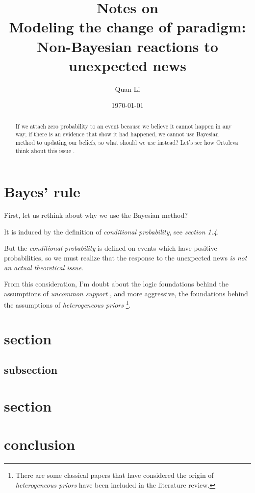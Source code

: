 \documentclass[12pt,letterpaper]{article}
\begin{document}
\title{\textbf{Notes on \citep{ortoleva2012modeling}}\\{\small \textbf{Modeling the change of paradigm: Non-Bayesian reactions to unexpected news}}}
\author{Quan Li}
\date{\today}
\maketitle

\begin{abstract}
If we attach zero probability to an event because we believe it cannot happen in any way, if there is an evidence that show it had happened, we cannot use Bayesian method to updating our beliefs, so what should we use instead? Let's see how Ortoleva think about this issue \cite{ortoleva2012modeling}.
\end{abstract}


\section{Bayes' rule}


First, let us rethink about why we use the Bayesian method?

It is induced by the definition of \emph{conditional probability}, see \cite{hogg2005introduction} \textit{section 1.4}.

But the \emph{conditional probability} is defined on events which have positive probabilities, so we must realize that the response to the unexpected news \emph{is not an actual theoretical issue}.

From this consideration, I'm doubt about the logic foundations behind the assumptions of \emph{uncommon support} \citep{galperti2015hide}, and more aggressive, the foundations behind the assumptions of \emph{heterogeneous priors} \citep{alonso2016bayesian}\footnote{There are some classical papers that have considered the origin of \emph{heterogeneous priors} have been included in the literature review.}.


\section{section}

\subsection{subsection}


\section{section}

\section{conclusion}
         



\end{document}
